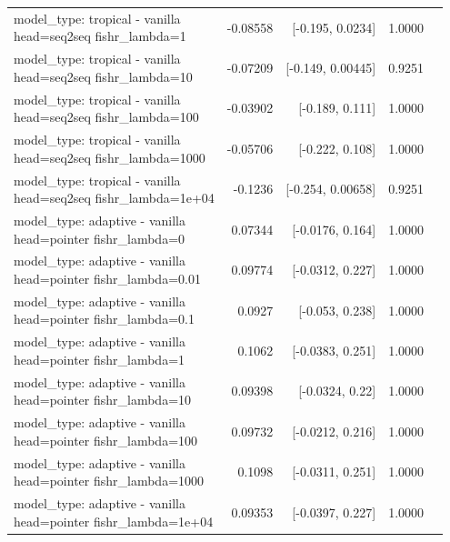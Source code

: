 \documentclass[10pt]{article}
\makeatletter
\newcommand{\stackcell}[1]{\begin{tabular}[t]{@{}l@{}}#1\end{tabular}}
\makeatother
\begin{document}
{\begin{longtable}{lrrrl}
\stackcell{model\_type: tropical - vanilla\\\footnotesize head=seq2seq fishr\_lambda=1 } & -0.08558 & [-0.195, 0.0234] & 1.0000 & \\
\stackcell{model\_type: tropical - vanilla\\\footnotesize head=seq2seq fishr\_lambda=10 } & -0.07209 & [-0.149, 0.00445] & 0.9251 & \\
\stackcell{model\_type: tropical - vanilla\\\footnotesize head=seq2seq fishr\_lambda=100 } & -0.03902 & [-0.189, 0.111] & 1.0000 & \\
\stackcell{model\_type: tropical - vanilla\\\footnotesize head=seq2seq fishr\_lambda=1000 } & -0.05706 & [-0.222, 0.108] & 1.0000 & \\
\stackcell{model\_type: tropical - vanilla\\\footnotesize head=seq2seq fishr\_lambda=1e+04 } & -0.1236 & [-0.254, 0.00658] & 0.9251 & \\
\stackcell{model\_type: adaptive - vanilla\\\footnotesize head=pointer fishr\_lambda=0 } & 0.07344 & [-0.0176, 0.164] & 1.0000 & \\
\stackcell{model\_type: adaptive - vanilla\\\footnotesize head=pointer fishr\_lambda=0.01 } & 0.09774 & [-0.0312, 0.227] & 1.0000 & \\
\stackcell{model\_type: adaptive - vanilla\\\footnotesize head=pointer fishr\_lambda=0.1 } & 0.0927 & [-0.053, 0.238] & 1.0000 & \\
\stackcell{model\_type: adaptive - vanilla\\\footnotesize head=pointer fishr\_lambda=1 } & 0.1062 & [-0.0383, 0.251] & 1.0000 & \\
\stackcell{model\_type: adaptive - vanilla\\\footnotesize head=pointer fishr\_lambda=10 } & 0.09398 & [-0.0324, 0.22] & 1.0000 & \\
\stackcell{model\_type: adaptive - vanilla\\\footnotesize head=pointer fishr\_lambda=100 } & 0.09732 & [-0.0212, 0.216] & 1.0000 & \\
\stackcell{model\_type: adaptive - vanilla\\\footnotesize head=pointer fishr\_lambda=1000 } & 0.1098 & [-0.0311, 0.251] & 1.0000 & \\
\stackcell{model\_type: adaptive - vanilla\\\footnotesize head=pointer fishr\_lambda=1e+04 } & 0.09353 & [-0.0397, 0.227] & 1.0000 & \\

\end{longtable}}
\end{document}
